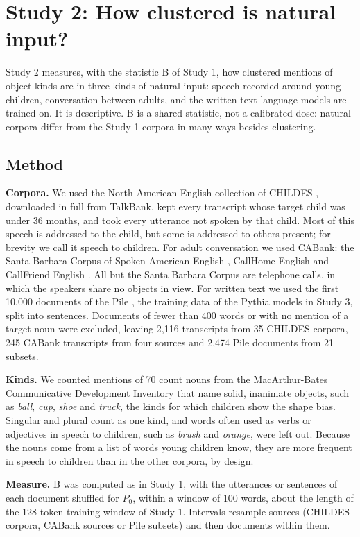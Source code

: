 \section{Study 2: How clustered is natural input?}
Study 2 measures, with the statistic B of Study 1, how clustered mentions of object kinds are in three kinds of natural input: speech recorded around young children, conversation between adults, and the written text language models are trained on. It is descriptive. B is a shared statistic, not a calibrated dose: natural corpora differ from the Study 1 corpora in many ways besides clustering.

\subsection{Method}
\textbf{Corpora.} We used the North American English collection of CHILDES \cite{macwhinney2000}, downloaded in full from TalkBank, kept every transcript whose target child was under 36 months, and took every utterance not spoken by that child. Most of this speech is addressed to the child, but some is addressed to others present; for brevity we call it speech to children. For adult conversation we used CABank: the Santa Barbara Corpus of Spoken American English \cite{dubois2004}, CallHome English \cite{canavan1997} and CallFriend English \cite{canavan1996a,canavan1996b}. All but the Santa Barbara Corpus are telephone calls, in which the speakers share no objects in view. For written text we used the first 10,000 documents of the Pile \cite{gao2020}, the training data of the Pythia models in Study 3, split into sentences. Documents of fewer than 400 words or with no mention of a target noun were excluded, leaving 2,116 transcripts from 35 CHILDES corpora, 245 CABank transcripts from four sources and 2,474 Pile documents from 21 subsets.

\textbf{Kinds.} We counted mentions of 70 count nouns from the MacArthur-Bates Communicative Development Inventory \cite{fenson2007} that name solid, inanimate objects, such as \emph{ball}, \emph{cup}, \emph{shoe} and \emph{truck}, the kinds for which children show the shape bias. Singular and plural count as one kind, and words often used as verbs or adjectives in speech to children, such as \emph{brush} and \emph{orange}, were left out. Because the nouns come from a list of words young children know, they are more frequent in speech to children than in the other corpora, by design.

\textbf{Measure.} B was computed as in Study 1, with the utterances or sentences of each document shuffled for $P_0$, within a window of 100 words, about the length of the 128-token training window of Study 1. Intervals resample sources (CHILDES corpora, CABank sources or Pile subsets) and then documents within them.

